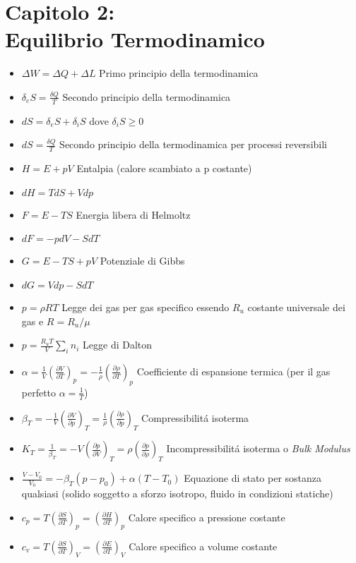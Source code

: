 \documentclass[a4paper]{article}
\begin{document}
\section{Capitolo 2:\\ Equilibrio Termodinamico}
\begin{itemize}
	\item $\Delta W = \Delta Q + \Delta L$ Primo principio della termodinamica
	\item $\delta_e S = \frac{\delta Q}{T}$ Secondo principio della termodinamica
	\item $dS = \delta_e S + \delta_i S$ dove $\delta_i S \geq 0 $
	\item $ dS = \frac{\delta Q}{T}$ Secondo principio della termodinamica per processi reversibili
	\item $H=E+pV$ Entalpia (calore scambiato a p costante)
	\item $dH=TdS+Vdp$
	\item $F=E-TS$ Energia libera di Helmoltz
	\item $dF=-pdV-SdT$
	\item $G=E-TS+pV$ Potenziale di Gibbs
	\item $dG=Vdp-SdT$
	\item $p=\rho R T$ Legge dei gas per gas specifico essendo $R_u$ costante universale dei gas e $R= R_u / \mu$
	\item $p = \frac{R_u T}{V}\sum_{i}^{}n_i$ Legge di Dalton
	\item $\alpha = \frac{1}{V}(\frac{\partial V}{\partial T})_p = -\frac{1}{\rho}(\frac{\partial \rho}{\partial T})_p$ Coefficiente di espansione termica (per il gas perfetto $\alpha = \frac{1}{T}$)
	\item $\beta_T=-\frac{1}{V}(\frac{\partial V}{\partial p})_T=\frac{1}{\rho}(\frac{\partial \rho}{\partial p})_T $ Compressibilit\'a isoterma
	\item $K_T=\frac{1}{\beta_T}=-V(\frac{\partial p}{\partial V})_T=\rho (\frac{\partial p}{\partial \rho})_T$ Incompressibilit\'a isoterma o \textit{Bulk Modulus}
	\item $ \frac{V-V_0}{V_0} = -\beta_T (p-p_0)+\alpha(T-T_0) $ Equazione di stato per sostanza qualsiasi (solido soggetto a sforzo isotropo, fluido in condizioni statiche)
	\item $c_p=T(\frac{\partial S}{\partial T})_p = (\frac{\partial H}{\partial T})_p$ Calore specifico a pressione costante
	\item $c_v=T(\frac{\partial S}{\partial T})_V = (\frac{\partial E}{\partial T})_V$ Calore specifico a volume costante

\end{itemize}
\end{document}
